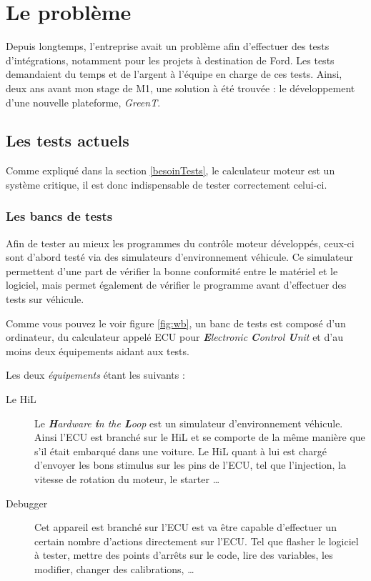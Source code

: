 \chapter{Le problème} \label{chapPb}
\putminitoc
Depuis longtemps, l'entreprise avait un problème afin d'effectuer des tests d'intégrations, notamment pour les projets à destination de Ford. Les tests demandaient du temps et de l'argent à l'équipe en charge de ces tests. Ainsi, deux ans avant mon stage de M1, une solution à été trouvée : le développement d'une nouvelle plateforme, \textit{GreenT}.

\vspace{-32px}
	\section{Les tests actuels} \label{pbTests}
	Comme expliqué dans la section \ref{besoinTests}, le calculateur moteur est un système critique, il est donc indispensable de tester correctement celui-ci.

	\subsection{Les bancs de tests}\label{wb}
	Afin de tester au mieux les programmes du contrôle moteur développés, ceux-ci sont d'abord testé via des simulateurs d'environnement véhicule. Ce simulateur permettent d'une part de vérifier la bonne conformité entre le matériel et le logiciel, mais permet également de vérifier le programme avant d'effectuer des tests sur véhicule.
		
	Comme vous pouvez le voir figure \ref{fig:wb}, un banc de tests est composé d'un ordinateur, du calculateur appelé ECU pour \textit{\textbf{E}lectronic \textbf{C}ontrol \textbf{U}nit} et d'au moins deux équipements aidant aux tests. 
	
	Les deux \textit{équipements} étant les suivants : 
	\begin{description}
		\item[Le HiL] Le \textit{\textbf{H}ardware \textbf{i}n the \textbf{L}oop} est un simulateur d'environnement véhicule. Ainsi l'ECU est branché sur le HiL et se comporte de la même manière que s'il était embarqué dans une voiture. Le HiL quant à lui est chargé d'envoyer les bons stimulus sur les pins de l'ECU, tel que l'injection, la vitesse de rotation du moteur, le starter \ldots
		\item[Debugger] Cet {appareil} est branché sur l'ECU est va être capable d'effectuer un certain nombre d'actions directement sur l'ECU. Tel que flasher le logiciel à tester, mettre des points d'arrêts sur le code, lire des variables, les modifier, changer des calibrations, \ldots
	\end{description}

